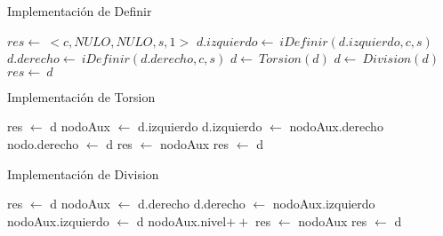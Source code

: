 \begin{Algoritmos}
\begin{algorithm}
\caption{Implementaci\'on de Definir}
\begin{algorithmic}[0]
		\State $res\gets \ <c, NULO, NULO, s, 1>$
		\State $d.izquierdo\gets \ iDefinir(d.izquierdo,c,s)$
		\State $d.derecho\gets \ iDefinir(d.derecho,c,s)$
	\EndIf
	\State $d \gets\ Torsion(d)$
	\State $d \gets\ Division(d)$
	\State $res\gets \ d$
\EndFunction
\end{algorithmic}
\end{algorithm}

\begin{algorithm}
\caption{Implementaci\'on de Torsion}
\begin{algorithmic}[0]
		\State res $\gets$ d
	\Else
			\State nodoAux $\gets$ d.izquierdo
			\State d.izquierdo $\gets$ nodoAux.derecho
			\State nodo.derecho $\gets$ d
			\State res $\gets$ nodoAux
		\Else
			\State res $\gets$ d
		\EndIf
	\EndIf
\EndFunction
\end{algorithmic}
\end{algorithm}

\begin{algorithm}
\caption{Implementaci\'on de Division}
\begin{algorithmic}[0]
		\State res $\gets$ d
	\Else
			\State nodoAux $\gets$ d.derecho
			\State d.derecho $\gets$ nodoAux.izquierdo
			\State nodoAux.izquierdo $\gets$ d
			\State nodoAux.nivel$++$
			\State res $\gets$ nodoAux
		\Else
			\State res $\gets$ d
		\EndIf
	\EndIf
\EndFunction
\end{algorithmic}
\end{algorithm}

\FloatBarrier
\end{Algoritmos}

